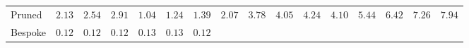 \documentclass[12pt,phd,lfcs,twoside,openright,logo,leftchapter,normalheadings]{infthesis}
\theoremstyle{plain}
\theoremstyle{definition}
\begin{document}
{\begin{table*}
\begin{tabular}{@{}| l | r@{\,} | r@{\,} | r@{\,} |@{\,}| r@{\,} | r@{\,} | r@{\,} |@{\,}| r@{\,} |@{\,}| r@{\,} | r@{\,} | r@{\,} |@{\,}| r@{\,} | r@{\,} | r@{\,} | r@{\,} | r@{\,} |@{}}
    Pruned &
    $2.13$ &
    $2.54$ &
    $2.91$ &
    $1.04$ &
    $1.24$ &
    $1.39$ &
    $2.07$ &
    $3.78$ &
    $4.05$ &
    $4.24$ &
    $4.10$ &
    $5.44$ &
    $6.42$ &
    $7.26$ &
    $7.94$
    \\\cline{1-16}

    Bespoke &
    $0.12$ &
    $0.12$ &
    $0.12$ &
    $0.13$ &
    $0.13$ &
    $0.12$ &
    \multicolumn{9}{l}{}
    \\\cline{1-7}
  \end{tabular}
\end{table*}}

\newcommand{\tabletwo}
{\begin{table*}
  \footnotesize
  \caption{MLton: Runtime Relative to Effectful Implementation}
  \label{tbl:results-mlton}
  \vspace{-2.5ex}
  \begin{tabular}{@{}| l | r@{\,} | r@{\,} | r@{\,} |@{\,}| r@{\,} | r@{\,} | r@{\,} |@{\,}| r@{\,} |@{\,}| r@{\,} | r@{\,} | r@{\,} |@{\,}| r@{\,} | r@{\,} | r@{\,} | r@{\,} | r@{\,} |@{}}
    \cline{2-16}
    \multicolumn{1}{l |}{} &
    \multicolumn{6}{@{}c@{} |@{\,}|}{\textbf{Queens}} &
    \multicolumn{9}{@{}c@{} |}{\textbf{Integration}}
    \\\cline{2-16}
    \multicolumn{1}{c |}{} &
    \multicolumn{3}{| @{}c@{} |@{\,}|}{\textbf{First solution}} &
    \multicolumn{3}{| @{}c@{} |@{\,}|}{\textbf{All solutions}} &
    \multicolumn{1}{@{}c@{} |@{\,}|}{\textbf{Id}} &
    \multicolumn{3}{  @{}c@{} |@{\,}|}{\textbf{Squaring}} &
    \multicolumn{5}{  @{}c@{} |}{\textbf{Logistic}}
    \\\cline{2-16}

    \multicolumn{1}{c |}{\emph{Parameter\!\!}} &
    \multicolumn{1}{@{}c@{} |}{$20$} &
    \multicolumn{1}{@{}c@{} |}{$24$} &
    \multicolumn{1}{@{}c@{} |@{\,}|}{$28$} &
    \multicolumn{1}{@{}c@{} |}{$8$} &
    \multicolumn{1}{@{}c@{} |}{$10$} &
    \multicolumn{1}{@{}c@{} |@{\,}|}{$12$} &
    \multicolumn{1}{@{}c@{} |@{\,}|}{$20$} &
    \multicolumn{1}{@{}c@{} |}{$14$} &
    \multicolumn{1}{@{}c@{} |}{$17$} &
    \multicolumn{1}{@{}c@{} |@{\,}|}{$20$} &
    \multicolumn{1}{@{}c@{} |}{$1$} &
    \multicolumn{1}{@{}c@{} |}{$2$} &
    \multicolumn{1}{@{}c@{} |}{$3$} &
    \multicolumn{1}{@{}c@{} |}{$4$} &
    \multicolumn{1}{@{}c@{} |}{$5$}
    \\\hline


\end{tabular}
\end{table*}}
\end{document}
